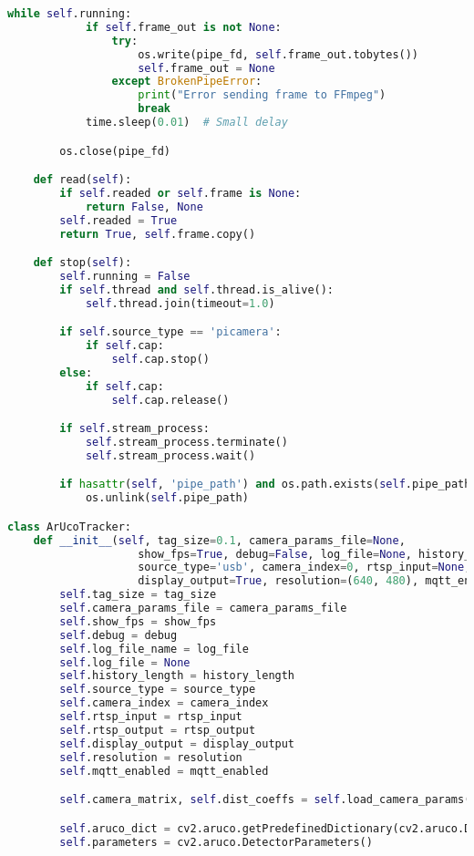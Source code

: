 \begin{lstlisting}[language=Python]
        while self.running:
            if self.frame_out is not None:
                try:
                    os.write(pipe_fd, self.frame_out.tobytes())
                    self.frame_out = None
                except BrokenPipeError:
                    print("Error sending frame to FFmpeg")
                    break
            time.sleep(0.01)  # Small delay

        os.close(pipe_fd)

    def read(self):
        if self.readed or self.frame is None:
            return False, None
        self.readed = True
        return True, self.frame.copy()

    def stop(self):
        self.running = False
        if self.thread and self.thread.is_alive():
            self.thread.join(timeout=1.0)

        if self.source_type == 'picamera':
            if self.cap:
                self.cap.stop()
        else:
            if self.cap:
                self.cap.release()

        if self.stream_process:
            self.stream_process.terminate()
            self.stream_process.wait()

        if hasattr(self, 'pipe_path') and os.path.exists(self.pipe_path):
            os.unlink(self.pipe_path)

class ArUcoTracker:
    def __init__(self, tag_size=0.1, camera_params_file=None,
                    show_fps=True, debug=False, log_file=None, history_length=5,
                    source_type='usb', camera_index=0, rtsp_input=None, rtsp_output=None,
                    display_output=True, resolution=(640, 480), mqtt_enabled=False):
        self.tag_size = tag_size
        self.camera_params_file = camera_params_file
        self.show_fps = show_fps
        self.debug = debug
        self.log_file_name = log_file
        self.log_file = None
        self.history_length = history_length
        self.source_type = source_type
        self.camera_index = camera_index
        self.rtsp_input = rtsp_input
        self.rtsp_output = rtsp_output
        self.display_output = display_output
        self.resolution = resolution
        self.mqtt_enabled = mqtt_enabled

        self.camera_matrix, self.dist_coeffs = self.load_camera_params(camera_params_file)

        self.aruco_dict = cv2.aruco.getPredefinedDictionary(cv2.aruco.DICT_APRILTAG_36h11)
        self.parameters = cv2.aruco.DetectorParameters()


\end{lstlisting}
